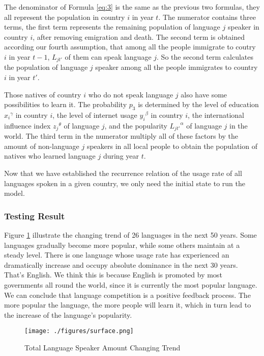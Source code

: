 \documentclass{mcmthesis}
\begin{document}
The denominator of Formula \ref{eq:3} is the same as the previous two formulas, they all represent the population in country $i$ in year $t$. The numerator contains three terms, the first term represents the remaining population of language $j$ speaker in country $i$, after removing emigration and death. The second term is obtained according our fourth assumption, that among all the people immigrate to coutry $i$ in year $t-1$, $L_{jt'}$ of them can speak language $j$. So the second term calculates the population of language $j$ speaker among all the people immigrates to country $i$ in year $t'$.

Those natives of country $i$ who do not speak language $j$ also have some possibilities to learn it. The probability $p_3$ is determined by the level of education ${x_i}^\gamma$ in country $i$, the level of internet usage ${y_i}^\beta$ in country $i$, the international influence index ${z_j}^\theta$ of language $j$, and the popularity ${L_{jt'}}^\alpha$ of language $j$ in the world. The third term in the numerator multiply all of these factors by the amount of non-language $j$ speakers in all local people to obtain the population of natives who learned language $j$ during year $t$.

Now that we have established the recurrence relation of the usage rate of all languages spoken in a given country, we only need the initial state to run the model.

\subsubsection{Testing Result}
Figure \ref{fig:surface} illustrate the changing trend of 26 languages in the next 50 years. Some languages gradually become more popular, while some others maintain at a steady level. There is one language whose usage rate has experienced an dramatically increase and occupy absolute dominance in the next 30 years. That's English. We think this is because English is promoted by most governments all round the world, since it is currently the most popular language. We can conclude that language competition is a positive feedback process. The more popular the language, the more people will learn it, which in turn lead to the increase of the language's popularity.
\begin{figure}[h!]
    \texttt{[image: ./figures/surface.png]}
    \caption{Total Language Speaker Amount Changing Trend} \label{fig:surface}
\end{figure}
\end{document}
